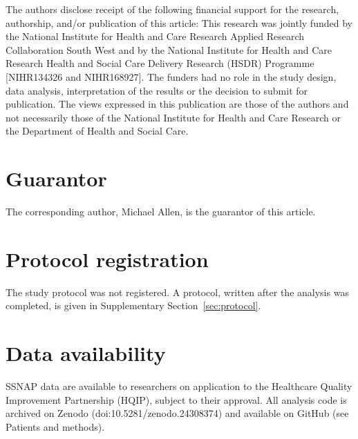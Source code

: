 The authors disclose receipt of the following financial support for the research, authorship, and/or publication of this article: This research was jointly funded by the National Institute for Health and Care Research Applied Research Collaboration South West and by the National Institute for Health and Care Research Health and Social Care Delivery Research (HSDR) Programme [NIHR134326 and NIHR168927]. The funders had no role in the study design, data analysis, interpretation of the results or the decision to submit for publication.
 The views expressed in this publication are those of the authors and not necessarily those of the National Institute for Health and Care Research or the Department of Health and Social Care. 

\section*{Guarantor}

The corresponding author, Michael Allen, is the guarantor of this article.

\section*{Protocol registration}

The study protocol was not registered. A protocol, written after the analysis was completed, is given in Supplementary Section~\ref{sec:protocol}.

\section*{Data availability}

SSNAP data are available to researchers on application to the Healthcare Quality Improvement Partnership (HQIP), subject to their approval. All analysis code is archived on Zenodo (doi:10.5281/zenodo.24308374)\cite{allen_samuel3_2026} and available on GitHub (see Patients and methods).